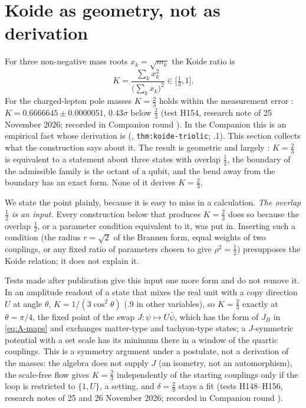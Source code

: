 \section{Koide as geometry, not as derivation}
\label{sec:B-koide}

For three non-negative mass roots $x_k=\sqrt{m_k}$ the Koide ratio is
\begin{equation}
 K=\frac{\sum_k x_k^2}{\bigl(\sum_k x_k\bigr)^2}\in\bigl[\tfrac13,1\bigr].
 \label{eq:B-koide}
\end{equation}
For the charged-lepton pole masses $K=\tfrac23$ holds within the measurement error \cite{Koide1983}: $K=0.6666645\pm0.0000051$,
$0.43\sigma$ below $\tfrac23$ (test H154, research note of 25 November 2026; recorded in Companion round ). In the
Companion this is an
empirical fact whose derivation is \Open{} (\cite{QSC}, \texttt{thm:koide-triolic}; .1). This section collects
what the construction says about it. The result is geometric and largely \Established: $K=\tfrac23$ is equivalent to a
statement about three states with overlap $\tfrac12$, the boundary of the admissible family is the octant of a qubit, and the
bend away from the boundary has an exact form. None of it derives $K=\tfrac23$.

We state the point plainly, because it is easy to miss in a calculation. \emph{The overlap $\tfrac12$ is an input.} Every
construction below that produces $K=\tfrac23$ does so because the overlap $\tfrac12$, or a parameter condition equivalent to
it, was put in. Inserting such a condition (the radius $r=\sqrt2$ of the Brannen form, equal weights of two couplings, or any
fixed ratio of parameters chosen to give $\rho^2=\tfrac12$) presupposes the Koide relation; it does not explain it.

Tests made after publication give this input one more form and do not remove it. In an amplitude readout of a state that
mixes the real unit with a copy direction $U$ at angle $\theta$, $K=1/(3\cos^2\theta)$ (.9 in other variables), so
$K=\tfrac23$ exactly at $\theta=\pi/4$, the fixed point of the swap $J\colon\psi\mapsto U\bar\psi$, which has the form of $J_B$
in \eqref{eq:A-maps} and exchanges matter-type and tachyon-type states; a $J$-symmetric potential with a set scale has its
minimum there in a window of the quartic couplings. This is a symmetry argument under a postulate, not a derivation of the
masses: the algebra does not supply $J$ (an isometry, not an automorphism), the scale-free flow gives $K=\tfrac23$
independently of the starting couplings only if the loop is restricted to $\{1,U\}$, a setting, and $\delta=\tfrac29$ stays a
fit (tests H148--H156, research notes of 25 and 26 November 2026; recorded in Companion round ).

